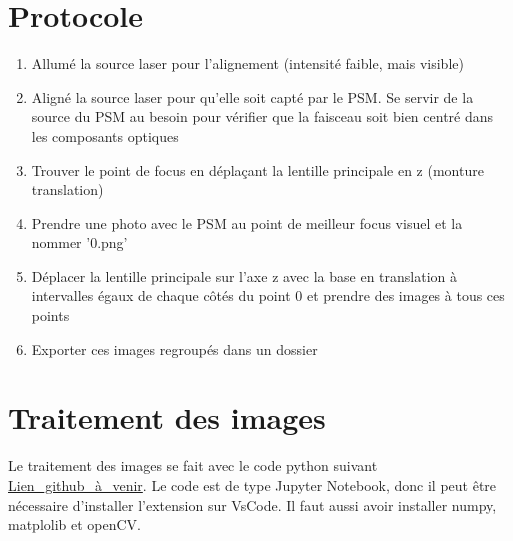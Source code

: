 \documentclass[11pt,letterpaper]{article}
\begin{document}
\section{Protocole}
\begin{enumerate}
    \item Allumé la source laser pour l'alignement (intensité faible, mais visible)
    \item Aligné la source laser pour qu'elle soit capté par le PSM. Se servir de la source du PSM au besoin pour vérifier que la faisceau soit bien centré dans les composants optiques
    \item Trouver le point de focus en déplaçant la lentille principale en z (monture translation)
    \item Prendre une photo avec le PSM au point de meilleur focus visuel et la nommer '0.png'
    \item Déplacer la lentille principale sur l'axe z avec la base en translation à intervalles égaux de chaque côtés du point 0 et prendre des images à tous ces points
    \item Exporter ces images regroupés dans un dossier
\end{enumerate}
\section{Traitement des images}
Le traitement des images se fait avec le code python suivant \url{Lien_github_à_venir}. Le code est de type Jupyter Notebook, donc il peut être nécessaire d'installer l'extension sur VsCode. Il faut aussi avoir installer numpy, matplolib et openCV.
\end{document}
